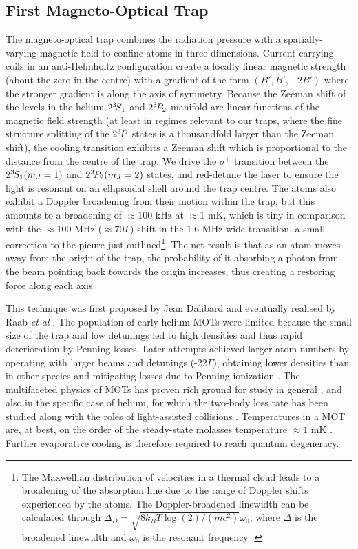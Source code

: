 \subsection*{First Magneto-Optical Trap}
	The magneto-optical trap combines the radiation pressure with a spatially-varying magnetic field to confine atoms in three dimensions.
	Current-carrying coils in an anti-Helmholtz configuration create a locally linear magnetic strength (about the zero in the centre) with a gradient of the form $(B',B',-2B')$ where the stronger gradient is along the axis of symmetry. 
	Because the Zeeman shift of the levels in the helium $2^{3\!} S_1$ and $2^{3\!} P_2$ manifold are linear functions of the magnetic field strength (at least in regimes relevant to our traps, where the fine structure splitting of the $2^{3\!} P$ states is a thousandfold larger than the Zeeman shift), the cooling transition exhibits a Zeeman shift which is proportional to the distance from the centre of the trap.
	We drive the $\sigma^+$ transition between the $2^{3\!} S_1(m_J=1)$ and $2^{3\!} P_2(m_J=2)$ states, and red-detune the laser to ensure the light is resonant on an ellipsoidal shell around the trap centre.
	The atoms also exhibit a Doppler broadening from their motion within the trap, but this amounts to a broadening of $\approx100$ kHz at $\approx1$ mK, which is tiny in comparison with the $\approx 100$ MHz ($\approx 70\Gamma$) shift in the $1.6$ MHz-wide transition, a small correction to the picure just outlined\footnote{The Maxwellian distribution of velocities in a thermal cloud leads to a broadening of the absorption line due to the range of Doppler shifts experienced by the atoms. The Doppler-broadened linewidth can be calculated through $\Delta_{D} = \sqrt{8 k_B T\log(2)/(mc^2)}\omega_0$, where $\Delta$ is the broadened linewidth and $\omega_0$ is the resonant frequency \cite{FootAtomic}.}.
	The net result is that as an atom moves away from the origin of the trap, the probability of it absorbing a photon from the beam pointing back towards the origin increases, thus creating a restoring force along each axis.

	This technique was first proposed by Jean Dalibard and eventually realised by Raab \emph{et al} \cite{Raab87}.
	The population of early helium MOTs were limited because the small size of the trap and low detunings led to high densities and thus rapid deterioration by Penning losses.
	Later attempts achieved larger atom numbers by operating with larger beams and detunings (-22$\Gamma$), obtaining lower densities than in other species and mitigating losses due to Penning ionization \cite{Tol99}.
	The multifaceted physics of MOTs has proven rich ground for study in general \cite{Townsend95,Walker90}, and also in the specific case of helium, for which the two-body loss rate has been studied \cite{Tol99} along with the roles of light-assisted collisions \cite{Stas06,McNamara07}. 
	Temperatures in a MOT are, at best, on the order of the steady-state molasses temperature $\approx1$ mK \cite{Lett81}.
	Further evaporative cooling is therefore required to reach quantum degeneracy.
	
